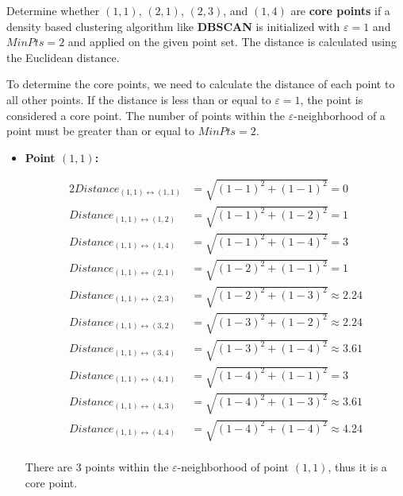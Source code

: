 \documentclass[
english,
smallborders
]{i6prcsht}
\begin{document}
Determine whether  $(1,1)$, $(2,1)$, $(2,3)$, and $(1,4)$ are \textbf{core points} if a density based clustering algorithm like \textbf{DBSCAN} is initialized with $\varepsilon = 1$ and $MinPts = 2$ and applied on the given point set. The distance is calculated using the Euclidean distance.

\begin{solution}
	To determine the core points, we need to calculate the distance of each point to all other points. If the distance is less than or equal to $\varepsilon = 1$, the point is considered a core point. The number of points within the $\varepsilon$-neighborhood of a point must be greater than or equal to $MinPts = 2$.
	
	\begin{itemize}
		\item \textbf{Point $(1,1)$:}
		      
		      \begin{alignat*}{2}
			      Distance_{(1,1)\leftrightarrow(1,1)} & = \sqrt{(1-1)^2+(1-1)^2} = 0          \\
			      Distance_{(1,1)\leftrightarrow(1,2)} & = \sqrt{(1-1)^2+(1-2)^2} = 1          \\
			      Distance_{(1,1)\leftrightarrow(1,4)} & = \sqrt{(1-1)^2+(1-4)^2} = 3          \\
			      Distance_{(1,1)\leftrightarrow(2,1)} & = \sqrt{(1-2)^2+(1-1)^2} = 1          \\
			      Distance_{(1,1)\leftrightarrow(2,3)} & = \sqrt{(1-2)^2+(1-3)^2} \approx 2.24 \\
			      Distance_{(1,1)\leftrightarrow(3,2)} & = \sqrt{(1-3)^2+(1-2)^2} \approx 2.24 \\
			      Distance_{(1,1)\leftrightarrow(3,4)} & = \sqrt{(1-3)^2+(1-4)^2} \approx 3.61 \\
			      Distance_{(1,1)\leftrightarrow(4,1)} & = \sqrt{(1-4)^2+(1-1)^2} = 3          \\
			      Distance_{(1,1)\leftrightarrow(4,3)} & = \sqrt{(1-4)^2+(1-3)^2} \approx 3.61 \\
			      Distance_{(1,1)\leftrightarrow(4,4)} & = \sqrt{(1-4)^2+(1-4)^2} \approx 4.24 \\
		      \end{alignat*}
		      
		      There are 3 points within the $\varepsilon$-neighborhood of point $(1,1)$, thus it is a core point.
		      
		      \dotfill
		      

\end{itemize}
\end{solution}
\end{document}
